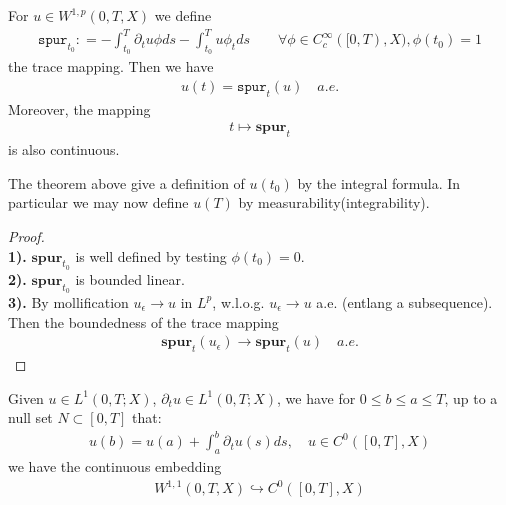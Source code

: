 \begin{theorem}
	For $u \in W^{1, p}(0, T, X)$ we define
	\begin{align*}
		\texttt{spur}_{t_0}: = - \int_{t_0}^T \partial_t u \phi ds - \int_{t_0}^T u \phi_t ds \qquad \forall \phi \in C^\infty_c([0, T), X), \phi(t_0) = 1
	\end{align*}
	the trace mapping. Then we have
	\begin{align*}
		u(t) = \texttt{spur}_t(u) \quad a.e.
	\end{align*}
	Moreover, the mapping 
	\begin{align*}
		t \mapsto \textbf{spur}_t
	\end{align*}
	is also continuous.
\end{theorem}
\begin{remark}
The theorem above give a definition of $u(t_0)$ by the integral formula. In particular we may now define $u(T)$ by measurability(integrability). 	
\end{remark}
\begin{proof}
	\quad\\
	\textbf{1). } $\textbf{spur}_{t_0}$ is well defined by testing $\phi(t_0) = 0$.\\
	\textbf{2). } $\textbf{spur}_{t_0}$ is bounded linear.\\
	\textbf{3). } By mollification $u_\epsilon \rightarrow u$ in $L^p$, w.l.o.g. $u_\epsilon \rightarrow u$ a.e. (entlang a subsequence). Then the boundedness of the trace mapping 
	\begin{align*}
		\textbf{spur}_t(u_\epsilon) \rightarrow \textbf{spur}_t(u) \quad a.e.
	\end{align*}
\end{proof}

\begin{theorem}
Given $ u \in L^1(0, T; X)$, $\partial_t u \in L^1(0, T; X)$, we have for $0 \le b \le a \le T$, up to a null set $N \subset [0, T]$ that:
\begin{align*}
	u(b) = u(a) + \int_a^b \partial_t u(s) ds , \quad u \in C^0([0, T], X)
\end{align*}
we have the continuous embedding
\begin{align*}
	W^{1, 1}(0, T, X) \hookrightarrow C^0([0, T], X)
\end{align*}
\end{theorem}




\newpage
